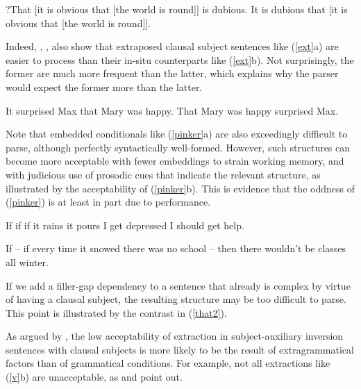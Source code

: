 \documentclass[output=paper]{langsci/langscibook}
\begin{document}
\ea
\ea ?That [it is obvious that [the world is round]] is dubious.
\ex It is dubious that [it is obvious that [the world is round]].\\
\citep{kuno74}
\z \label{exps}
\z


\noindent
  Indeed, \citet{fodor67},  \citet{bever}, \citet{frazier88} also
 show that extraposed clausal subject sentences
 like (\ref{ext}a) are easier to process than
their in-situ counterparts like (\ref{ext}b). 
Not surprisingly,  the former are much more frequent than the latter,
which  explains why the parser would expect the former more than the latter.


\ea
\ea It surprised Max that Mary was happy. 
\ex That Mary was happy surprised Max.
\z \label{ext}
\z






\noindent
Note that embedded conditionals like (\ref{pinker}a) are also exceedingly 
difficult to parse, although perfectly syntactically well-formed.
However,   such structures can become more acceptable with fewer embeddings to strain
working memory, and with judicious use of prosodic cues that indicate  the relevant structure, as illustrated by  the acceptability of (\ref{pinker}b).
This is  evidence that the oddness of (\ref{pinker}) is
at least in part due to performance. 

\ea
\ea If if if it rains it pours I get depressed I should get help.

\ex If -- if every time it snowed there was no school -- then there wouldn't be classes all winter.
\z \label{pinker}
\z

  
  
  
  If we add a filler-gap dependency to a sentence that already is complex by
  virtue of having  a clausal  subject, the resulting structure
  may be too difficult to parse.  This   point is illustrated by
  the contrast in (\ref{that2}).



\eal
{}
\label{that2}
\zl


\noindent
As argued by \citet{dubinsky2009}, the low acceptability
 of extraction in subject-auxiliary inversion sentences with clausal subjects 
  is more likely to be the result of extragrammatical factors than of grammatical conditions.
For example,  not all extractions like (\ref{v}b) are unacceptable, as
\citet[382--387]{delahunty} and
\citet[115]{dubinsky2009} point out. 
\end{document}
